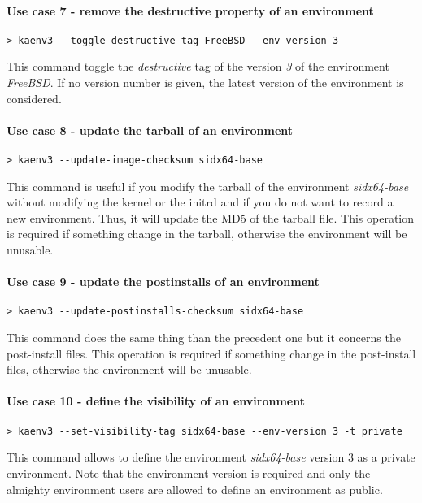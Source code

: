 \documentclass[a4wide,10pt,oneside]{book}
\begin{document}
\paragraph{Use case 7 - remove the destructive property of an environment}
\begin{verbatim}
> kaenv3 --toggle-destructive-tag FreeBSD --env-version 3
\end{verbatim}
This command toggle the \textit{destructive} tag of the version \textit{3} of the environment \textit{FreeBSD}. If no version number is given, the latest version of the environment is considered.

\paragraph{Use case 8 - update the tarball of an environment}
\begin{verbatim}
> kaenv3 --update-image-checksum sidx64-base
\end{verbatim}
This command is useful if you modify the tarball of the environment \textit{sidx64-base} without modifying the kernel or the initrd and if you do not want to record a new environment. Thus, it will update the MD5 of the tarball file. This operation is required if something change in the tarball, otherwise the environment will be unusable.

\paragraph{Use case 9 - update the postinstalls of an environment}
\begin{verbatim}
> kaenv3 --update-postinstalls-checksum sidx64-base
\end{verbatim}
This command does the same thing than the precedent one but it concerns the post-install files. This operation is required if something change in the post-install files, otherwise the environment will be unusable.

\paragraph{Use case 10 - define the visibility of an environment}
\begin{verbatim}
> kaenv3 --set-visibility-tag sidx64-base --env-version 3 -t private
\end{verbatim}
This command allows to define the environment \textit{sidx64-base} version 3 as a private environment. Note that the environment version is required and only the almighty environment users are allowed to define an environment as public.
\end{document}
